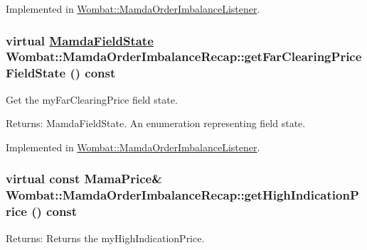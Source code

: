 Implemented in \hyperlink{classWombat_1_1MamdaOrderImbalanceListener_f794cdda271d04cc569e18222146e3a6}{Wombat::Mamda\-Order\-Imbalance\-Listener}.\hypertarget{classWombat_1_1MamdaOrderImbalanceRecap_dce3165730870835e74d2fb704965cad}{
\subsubsection[getFarClearingPriceFieldState]{\setlength{\rightskip}{0pt plus 5cm}virtual \hyperlink{namespaceWombat_93aac974f2ab713554fd12a1fa3b7d2a}{Mamda\-Field\-State} Wombat::Mamda\-Order\-Imbalance\-Recap::get\-Far\-Clearing\-Price\-Field\-State () const}}
\label{classWombat_1_1MamdaOrderImbalanceRecap_dce3165730870835e74d2fb704965cad}


Get the my\-Far\-Clearing\-Price field state. 

\begin{Desc}
\item[Returns:]Mamda\-Field\-State. An enumeration representing field state. \end{Desc}


Implemented in \hyperlink{classWombat_1_1MamdaOrderImbalanceListener_9a23b7703628b621deed5abcbc1b0e97}{Wombat::Mamda\-Order\-Imbalance\-Listener}.\hypertarget{classWombat_1_1MamdaOrderImbalanceRecap_1d1c151048651f612b924b30d378db9f}{
\subsubsection[getHighIndicationPrice]{\setlength{\rightskip}{0pt plus 5cm}virtual const Mama\-Price\& Wombat::Mamda\-Order\-Imbalance\-Recap::get\-High\-Indication\-Price () const}}
\label{classWombat_1_1MamdaOrderImbalanceRecap_1d1c151048651f612b924b30d378db9f}


\begin{Desc}
\item[Returns:]Returns the my\-High\-Indication\-Price. \end{Desc}


